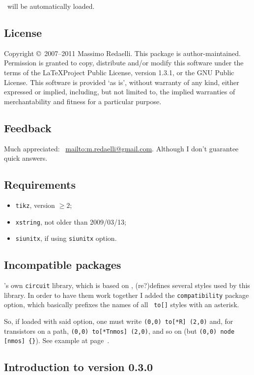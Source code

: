 \documentclass[a4paper]{article}
\newcommand{\email}[2][]{\def\temp{#1}\ifx\temp\empty\Email~\fi\href{mailto:#2}{#2}}
\begin{document}
\TikZ\ will be automatically loaded.

\subsection{License}
Copyright \copyright\ 2007--2011 Massimo Redaelli. This package is author-maintained.
Permission is granted to copy, distribute and/or modify this software under the
terms of the \LaTeX Project Public License, version 1.3.1, or the GNU Public License. This software is provided ‘as is’, without warranty of any kind, either expressed or implied, including, but not limited to, the implied warranties of merchantability and fitness for a
particular purpose.

\subsection{Feedback}
Much appreciated: \email{mailto:m.redaelli@gmail.com}. Although I don't guarantee quick answers.

\subsection{Requirements}
\begin{itemize}
 \item \texttt{tikz}, version $\ge 2$;
 \item \texttt{xstring}, not older than 2009/03/13;
 \item \texttt{siunitx}, if using \texttt{siunitx} option.
\end{itemize}

\subsection{Incompatible packages}

\TikZ's own \texttt{circuit} library, which is based on \Circuitikz, (re?)defines several styles used by this library. In order to have them work together I added the \texttt{compatibility} package option, which basically prefixes the names of all \Circuitikz\ \texttt{to[]} styles with an asterisk.

So, if loaded with said option, one must write \verb!(0,0) to[*R] (2,0)! and, for transistors on a path, \verb!(0,0) to[*Tnmos] (2,0)!, and so on (but \verb!(0,0) node [nmos] {}!). See example at page~\pageref{ex:compatibility}.

\subsection{Introduction to version 0.3.0}
\end{document}
